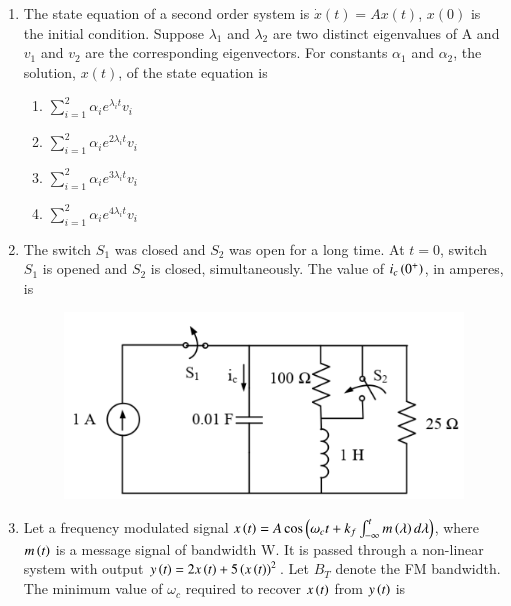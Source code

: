 \documentclass[a4paper, 11pt]{article}
\begin{document}
\begin{enumerate}
    \hfill{}
    
    \item The state equation of a second order system is $\dot{x}(t) = Ax(t)$, $x(0)$ is the initial condition. Suppose $\lambda_1$ and $\lambda_2$ are two distinct eigenvalues of A and $v_1$ and $v_2$ are the corresponding eigenvectors. For constants $\alpha_1$ and $\alpha_2$, the solution, $x(t)$, of the state equation is

    \begin{enumerate}
        \item $\sum_{i=1}^{2}\alpha_i e^{\lambda_i t} v_i$
        \item $\sum_{i=1}^{2}\alpha_i e^{2\lambda_i t} v_i$
        \item $\sum_{i=1}^{2}\alpha_i e^{3\lambda_i t} v_i$
        \item $\sum_{i=1}^{2}\alpha_i e^{4\lambda_i t} v_i$
    \end{enumerate}

    \hfill{}
    
    \item The switch $S_1$ was closed and $S_2$ was open for a long time. At $t=0$, switch $S_1$ is opened and $S_2$ is closed, simultaneously. The value of $i_c\left(0^+\right)$, in amperes, is
    \begin{figure}[H]
        \centering
        \includegraphics[width=0.5\columnwidth]{figs/Q34.png}
        \caption*{}
        \label{fig:q44}
    \end{figure}
    \begin{enumerate}
    \end{enumerate}
    
    \hfill{}
    
    \item Let a frequency modulated  signal $x\left(t\right)=A \cos\left(\omega_c t + k_f \int_{-\infty}^{t} m\left(\lambda\right) d\lambda\right)$, where $m\left(t\right)$ is a message signal of bandwidth W. It is passed through a non-linear system with output $y\left(t\right)=2x\left(t\right)+5\left(x\left(t\right)\right)^2$. Let $B_T$ denote the FM bandwidth. The minimum value of $\omega_c$ required to recover $x\left(t\right)$ from $y\left(t\right)$ is
    

\end{enumerate}
\end{document}
